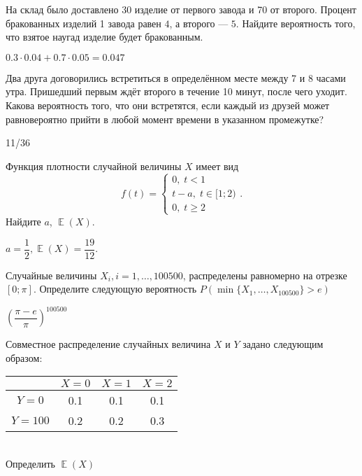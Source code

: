 \documentclass[12pt, addpoints, answers]{exam} %
\DeclareMathOperator{\E}{\mathbb{E}}
\begin{document}
\begin{questions}


\question На склад было доставлено 30 изделие от первого завода и 70 от второго. Процент бракованных изделий 1 завода равен $4$, а второго --- $5$. Найдите вероятность того, что взятое наугад изделие будет бракованным.

\begin{solution}
 $0.3\cdot0.04+0.7\cdot0.05 = 0.047$
\end{solution}


\question Два друга договорились встретиться в определённом месте между 7 и 8 часами утра. Пришедший первым ждёт второго в течение 10 минут, после чего уходит. Какова вероятность того, что они встретятся, если каждый из друзей может равновероятно прийти в любой момент времени в указанном промежутке?

\begin{solution}
 11/36
\end{solution}

\question Функция плотности случайной величины $X$ имеет вид
\[
f(t)=\begin{cases}
0, \; t< 1 \\
t-a, \; t \in [1;2) \\
0, \; t \geq 2
\end{cases}.
\]
Найдите $a$, $\E(X)$.

\begin{solution}
 $a=\dfrac{1}{2}, \E(X)=\dfrac{19}{12}.$
\end{solution}

\question Случайные величины $X_i, i=1, \ldots, 100500$, распределены равномерно на отрезке $[0;\pi]$. Определите следующую вероятность $P(\min\{X_1,\ldots, X_{100500}\}>e)$

\begin{solution} $\left(\dfrac{\pi-e}{\pi}\right)^{100500}$
\end{solution}

\question
Совместное распределение случайных величина $X$ и $Y$ задано следующим образом:\\
 \begin{tabular}{c|c|c|c|}
 \centering
  & $X=0$ & $X=1$  & $X=2$  \\
\hline $Y=0$ & 0.1 & 0.1 & 0.1 \\
\hline  $Y=100$&  0.2& 0.2 & 0.3 \\
\hline
\end{tabular} \\
Определить $\E(X)$ 


\end{questions}
\end{document}
